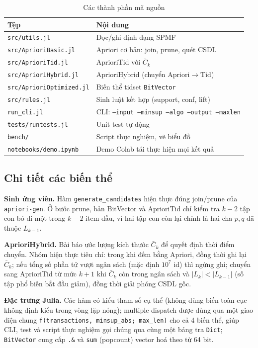 \documentclass[10pt,twocolumn,letterpaper]{article}
\begin{document}
\begin{table}[t]
\centering
\caption{Các thành phần mã nguồn}
\label{tab:code}
\footnotesize
\begin{tabular}{@{}l>{\raggedright\arraybackslash}p{5.1cm}@{}}
\toprule
Tệp & Nội dung \\ \midrule
\texttt{src/utils.jl} & Đọc/ghi định dạng SPMF \\
\texttt{src/AprioriBasic.jl} & Apriori cơ bản: join, prune, quét CSDL \\
\texttt{src/AprioriTid.jl} & AprioriTid với $\bar{C}_k$ \\
\texttt{src/AprioriHybrid.jl} & AprioriHybrid (chuyển Apriori$\to$Tid) \\
\texttt{src/AprioriOptimized.jl} & Biến thể tidset \texttt{BitVector} \\
\texttt{src/rules.jl} & Sinh luật kết hợp (support, conf, lift) \\
\texttt{run\_cli.jl} & CLI: \texttt{--input --minsup --algo --output --maxlen} \\
\texttt{tests/runtests.jl} & Unit test tự động \\
\texttt{bench/} & Script thực nghiệm, vẽ biểu đồ \\
\texttt{notebooks/demo.ipynb} & Demo Colab tái thực hiện mọi kết quả \\
\bottomrule
\end{tabular}
\end{table}

\subsection{Chi tiết các biến thể}
\textbf{Sinh ứng viên.} Hàm \texttt{generate\_candidates} hiện thực đúng join/prune của \texttt{apriori-gen}. Ở bước prune, bản BitVector và AprioriTid chỉ kiểm tra $k-2$ tập con bỏ đi một trong $k-2$ item đầu, vì hai tập con còn lại chính là hai cha $p,q$ đã thuộc $L_{k-1}$.

\textbf{AprioriHybrid.} Bài báo ước lượng kích thước $\bar{C}_k$ để quyết định thời điểm chuyển. Nhóm hiện thực tiêu chí: trong khi đếm bằng Apriori, đồng thời ghi lại $\bar{C}_k$; nếu tổng số phần tử vượt ngân sách (mặc định $10^7$ id) thì ngừng ghi; chuyển sang AprioriTid từ mức $k+1$ khi $\bar{C}_k$ còn trong ngân sách và $|L_k|<|L_{k-1}|$ (số tập phổ biến bắt đầu giảm), đồng thời giải phóng CSDL gốc.

\textbf{Đặc trưng Julia.} Các hàm có kiểu tham số cụ thể (không dùng biến toàn cục không định kiểu trong vòng lặp nóng); multiple dispatch được dùng qua một giao diện chung \texttt{f(transactions, minsup\_abs; max\_len)} cho cả 4 biến thể, giúp CLI, test và script thực nghiệm gọi chúng qua cùng một bảng tra \texttt{Dict}; \texttt{BitVector} cung cấp \texttt{.\&} và \texttt{sum} (popcount) vector hoá theo từ 64 bit.
\end{document}
